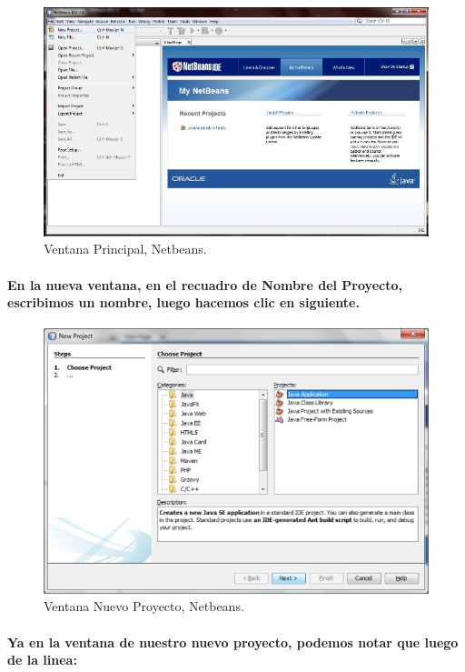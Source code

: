 \documentclass[12pt]{book} %
\begin{document}
	\begin{figure}[h]
		\centering
			\includegraphics[width=16cm]{Hola_mundo_001.jpg}
			\caption{Ventana Principal, Netbeans.}
		
	\end{figure}

\paragraph{En la nueva ventana, en el recuadro de Nombre del Proyecto, escribimos un nombre, luego hacemos clic en siguiente.}

	\begin{figure}[h]
		\centering
			\includegraphics[width=12cm]{Hola_mundo_002.jpg}
			\caption{Ventana Nuevo Proyecto, Netbeans.}
		
	\end{figure}

\paragraph{Ya en la ventana de nuestro nuevo proyecto, podemos notar que luego de la linea:}
\end{document}
